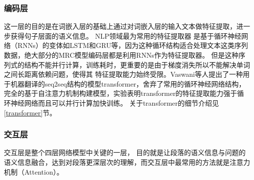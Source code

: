 \subsubsection{编码层}
这一层的目的是在词嵌入层的基础上通过对词嵌入层的输入文本做特征提取，进一步获得句子层面的语义信息。
NLP领域最为常用的特征提取器
是基于循环神经网络（RNNs）的变体如LSTM和GRU等，因为这种循环结构适合处理文本这类序列数据，绝大部分的MRC模型编码层都是利用RNNs作为特征提取器。
但是这种序列式的结构不能并行计算，训练耗时，更重要的是由于梯度消失所以不能解决单词之间长距离依赖问题，使得其
特征提取能力始终受限。Vaswani等人提出了一种用于机器翻译的seq2seq结构的模型transformer，舍弃了常用的循环神经网络结构，完全的基于自注意力机制构建模型，实验表明transformer的特征提取能力强于循环神经网络而且可以并行计算加快训练。
关于transformer的细节介绍见\ref{transformer}节。



\subsubsection{交互层}\label{interaction}
交互层是整个四层网络模型中关键的一层，
目的就是让段落的语义信息与问题的
语义信息融合，达到对段落更深层次的理解，而交互层中最常用的方法就是注意力机制（Attention）。

